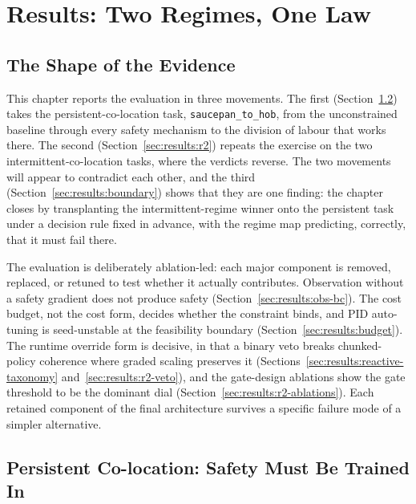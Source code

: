 \documentclass[11pt,a4paper]{report}
\begin{document}

\chapter{Results: Two Regimes, One Law}
\label{ch:eval}

\section{The Shape of the Evidence}
\label{sec:results:ablation-map}

This chapter reports the evaluation in three movements. The first
(Section~\ref{sec:results:r1}) takes the persistent-co-location
task, \texttt{saucepan\_to\_hob}, from the unconstrained baseline
through every safety mechanism to the division of labour that works
there. The second (Section~\ref{sec:results:r2}) repeats the
exercise on the two intermittent-co-location tasks, where the
verdicts reverse. The two movements will appear to contradict each
other, and the third (Section~\ref{sec:results:boundary}) shows that
they are one finding: the chapter closes by transplanting the
intermittent-regime winner onto the persistent task under a decision
rule fixed in advance, with the regime map predicting, correctly,
that it must fail there.

The evaluation is deliberately ablation-led: each major component is
removed, replaced, or retuned to test whether it actually
contributes. Observation without a safety gradient does not produce
safety (Section~\ref{sec:results:obs-bc}). The cost budget, not the
cost form, decides whether the constraint binds, and PID auto-tuning
is seed-unstable at the feasibility boundary
(Section~\ref{sec:results:budget}). The runtime override form is
decisive, in that a binary veto breaks chunked-policy coherence where
graded scaling preserves it
(Sections~\ref{sec:results:reactive-taxonomy}
and~\ref{sec:results:r2-veto}), and the gate-design ablations show
the gate threshold to be the dominant dial
(Section~\ref{sec:results:r2-ablations}). Each retained component of
the final architecture survives a specific failure mode of a simpler
alternative.

\section{Persistent Co-location: Safety Must Be Trained In}
\label{sec:results:r1}
\end{document}
